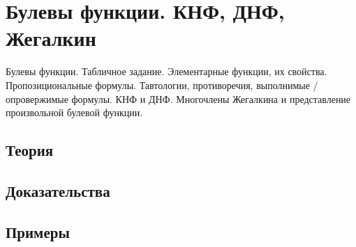 
\section{Булевы функции. КНФ, ДНФ, Жегалкин}
\label{sec:2.3a.01-boolean-functions}

\begin{ticket}
Булевы функции. Табличное задание. Элементарные функции, их свойства. Пропозициональные формулы. Тавтологии, противоречия, выполнимые / опровержимые формулы. КНФ и ДНФ. Многочлены Жегалкина и представление произвольной булевой функции.
\end{ticket}

\subsection*{Теория}

\subsection*{Доказательства}

\subsection*{Примеры}
